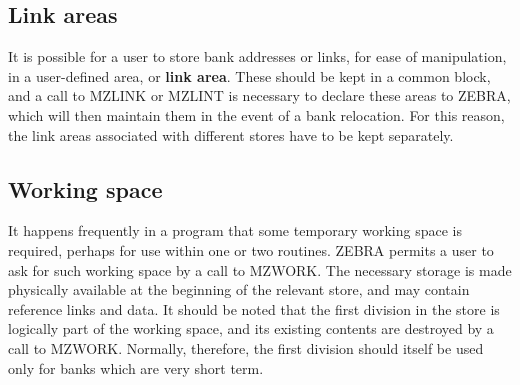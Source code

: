 \subsection{Link areas}
\par
It is possible for a user to store bank addresses or links, for ease
of manipulation, in a user-defined area, or {\bf link area}.
These should be kept in a common block, and a call to
MZLINK or MZLINT is necessary to declare these areas to ZEBRA, which
will then maintain them in the event of a bank relocation. For this
reason, the link areas associated with different stores have to be kept
separately.
\subsection{Working space}
\par
It happens frequently in a program that some temporary working space is
required, perhaps for use within one or two routines. ZEBRA permits a
user to ask for such working space by a call to MZWORK. The necessary
storage is made physically available at the beginning of the relevant
store, and may contain reference links and data. It should be noted that
the first division in the store is logically part of the working space,
and its existing contents are destroyed by a call to MZWORK. Normally,
therefore, the first division should itself be used only for banks which
are very short term.
